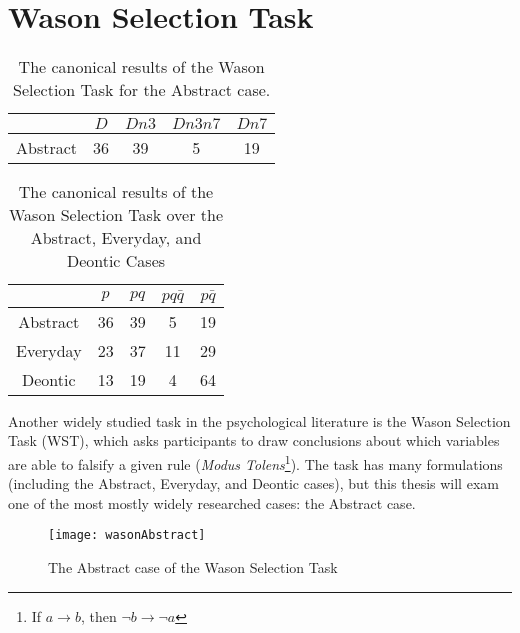 \section{Wason Selection Task}
\begin{table}
\begin{center}


\begin{tabular}{ c c c c c}
  & \textbf{$D$} & \textbf{$Dn3$} & \textbf{$Dn3n7$} & \textbf{$Dn7$}\\ 
  \hline
 Abstract & 36 & 39 & 5 & 19\\  
\end{tabular}
\caption{The canonical results of the Wason Selection Task for the Abstract case.}
\label{tbl:can}
\end{center}
\end{table}

\begin{table}
\begin{center}
\begin{tabular}{ c c c c c}
  & \textbf{$p$} & \textbf{$pq$} & \textbf{$pq\bar{q}$} & \textbf{$p\bar{q}$}\\ 
  \hline
 Abstract & 36 & 39 & 5 & 19\\  
 Everyday & 23 & 37 & 11 & 29\\  
 Deontic & 13 & 19 & 4 & 64
\end{tabular}
\caption{The canonical results of the Wason Selection Task over the Abstract, Everyday, and Deontic Cases}
\label{tbl:can_full}
\end{center}
\end{table}

Another widely studied task in the psychological literature is the Wason Selection Task (WST), which asks participants to draw conclusions about which variables are able to falsify a given rule (\textit{Modus Tolens}\footnote{If $a\rightarrow b$, then $\lnot b \rightarrow \lnot a$}). The task has many formulations (including the Abstract, Everyday, and Deontic cases), but this thesis will exam one of the most mostly widely researched cases: the Abstract case. 

\begin{figure}
\begin{center}
\texttt{[image: wasonAbstract]}
\caption{The Abstract case of the Wason Selection Task}
\label{fig:wst}
\end{center}

\end{figure}

